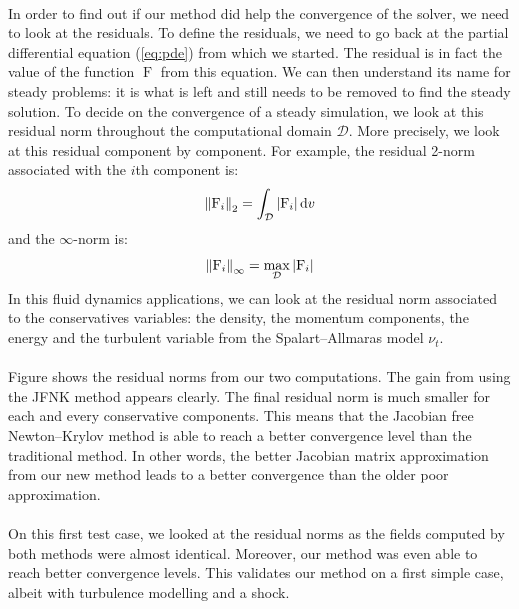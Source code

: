         \paragraph{}
        In order to find out if our method did help the convergence of the solver, we need to look at the residuals.
        To define the residuals, we need to go back at the partial differential equation (\ref{eq:pde}) from which we started.
        The residual is in fact the value of the function $\operatorname{F}$ from this equation.
        We can then understand its name for steady problems: it is what is left and still needs to be removed to find the steady solution.
        To decide on the convergence of a steady simulation, we look at this residual norm throughout the computational domain $\mathcal{D}$.
        More precisely, we look at this residual component by component.
        For example, the residual 2-norm associated with the $i$th component is:
        \begin{equation}
          \norm[2]{\operatorname{F}_i} = \int_\mathcal{D} \left| \operatorname{F}_i \right| \mathrm{d}v
        \end{equation}
        and the $\infty$-norm is:
        \begin{equation}
          \norm[\infty]{\operatorname{F}_i} = \max_\mathcal{D} \left| \operatorname{F}_i \right|
        \end{equation}
        In this fluid dynamics applications, we can look at the residual norm associated to the conservatives variables: the density, the momentum components, the energy and the turbulent variable from the Spalart--Allmaras model $\nu_t$.

        \paragraph{}
        Figure  shows the residual norms from our two computations.
        The gain from using the JFNK method appears clearly.
        The final residual norm is much smaller for each and every conservative components.
        This means that the Jacobian free Newton--Krylov method is able to reach a better convergence level than the traditional method.
        In other words, the better Jacobian matrix approximation from our new method leads to a better convergence than the older poor approximation.

        \paragraph{}
        On this first test case, we looked at the residual norms as the fields computed by both methods were almost identical.
        Moreover, our method was even able to reach better convergence levels.
        This validates our method on a first simple case, albeit with turbulence modelling and a shock.


